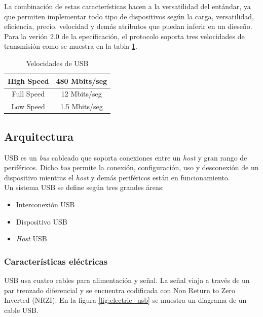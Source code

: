 La combinaci\'on de estas caracter\'isticas hacen a la versatilidad del
ent\'andar, ya que permiten implementar todo tipo de dispositivos seg\'un la
carga, versatilidad, eficiencia, precio, velocidad y dem\'as atributos que
puedan inferir en un diese\~no.\\

Para la veri\'on 2.0 de la epecificaci\'on, el protocolo soporta tres
velocidades de transmisi\'on como se muestra en la
tabla \ref{tab:velocidad_usb}.

\begin{table}[ht]
\centering
\begin{tabular}{|c|c|}        \hline
High Speed & 480 Mbits/seg \\ \hline 
Full Speed & 12 Mbits/seg  \\ \hline
Low Speed & 1.5 Mbits/seg  \\ \hline
\end{tabular}
\caption{Velocidades de USB} 
\label{tab:velocidad_usb}
\end{table}

\subsection{Arquitectura}

USB es un \emph{bus} cableado que soporta conexiones entre un \emph{host} y
gran rango de perif\'ericos. Dicho \emph{bus} permite la conexi\'on,
configuraci\'on, uso y desconexi\'on de un dispositivo mientras el \emph{host}
y dem\'as perif\'ericos est\'an en funcionamiento. \\

Un sistema USB se  define seg\'un tres grandes \'areas:

\begin{itemize}
 \item Interconexi\'on USB
 \item Dispositivo USB
 \item \emph{Host} USB
\end{itemize}

\subsubsection{Caracter\'isticas el\'ectricas}

USB usa cuatro cables para alimentaci\'on y se\~nal. La se\~nal viaja a
trav\'es
de un par trenzado diferencial y se encuentra codificada con Non Return to Zero
Inverted (NRZI). En la figura \ref{fig:electric_usb} se muestra un diagrama de
un cable
USB.

